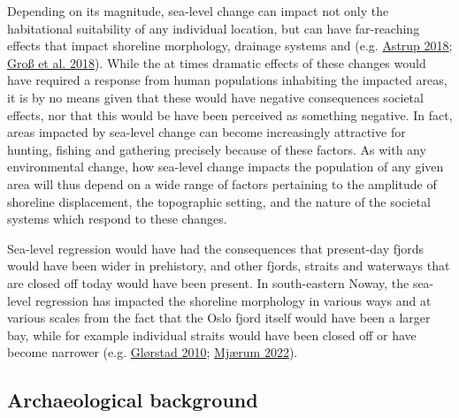\documentclass[
  a4paper,
  oneside]{uiophdthesis}
\begin{document}
Depending on its magnitude, sea-level change can impact not only the habitational suitability of any individual location, but can have far-reaching effects that impact shoreline morphology, drainage systems and (e.g. \protect\hyperlink{ref-astrup2018}{Astrup 2018}; \protect\hyperlink{ref-gross2018}{Groß et al. 2018}). While the at times dramatic effects of these changes would have required a response from human populations inhabiting the impacted areas, it is by no means given that these would have negative consequences societal effects, nor that this would be have been perceived as something negative. In fact, areas impacted by sea-level change can become increasingly attractive for hunting, fishing and gathering precisely because of these factors. As with any environmental change, how sea-level change impacts the population of any given area will thus depend on a wide range of factors pertaining to the amplitude of shoreline displacement, the topographic setting, and the nature of the societal systems which respond to these changes.

Sea-level regression would have had the consequences that present-day fjords would have been wider in prehistory, and other fjords, straits and waterways that are closed off today would have been present. In south-eastern Noway, the sea-level regression has impacted the shoreline morphology in various ways and at various scales from the fact that the Oslo fjord itself would have been a larger bay, while for example individual straits would have been closed off or have become narrower (e.g. \protect\hyperlink{ref-glorstad2010}{Glørstad 2010}; \protect\hyperlink{ref-mjuxe6rum2022}{Mjærum 2022}).

\hypertarget{archaeological-background}{%
\subsection{Archaeological background}\label{archaeological-background}}
\end{document}
